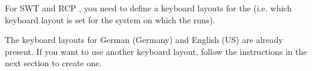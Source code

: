 For SWT and RCP \gdauts{}, you need to define a keyboard layouts for the \gdaut{} (i.e. which keyboard layout is set for the system on which the \gdaut{} runs).

The  keyboard layouts for German (Germany) and English (US) are already present. If you want to use another keyboard layout, follow the instructions in the next section to create one.  
